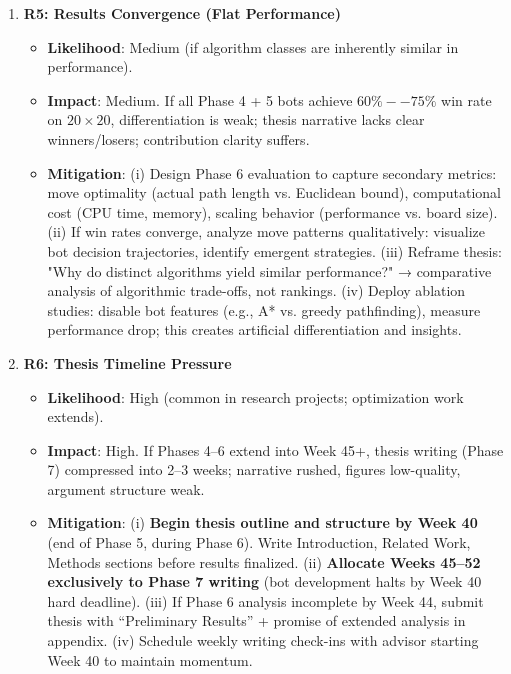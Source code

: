 \documentclass[11pt,a4paper]{article}
\begin{document}
\begin{enumerate}
    \item \textbf{R5: Results Convergence (Flat Performance)}
    \begin{itemize}
        \item \textbf{Likelihood}: Medium (if algorithm classes are inherently similar in performance).
        \item \textbf{Impact}: Medium. If all Phase 4 + 5 bots achieve $60\%--75\%$ win rate on $20 \times 20$, differentiation is weak; thesis narrative lacks clear winners/losers; contribution clarity suffers.
        \item \textbf{Mitigation}: (i) Design Phase 6 evaluation to capture secondary metrics: move optimality (actual path length vs. Euclidean bound), computational cost (CPU time, memory), scaling behavior (performance vs. board size). (ii) If win rates converge, analyze move patterns qualitatively: visualize bot decision trajectories, identify emergent strategies. (iii) Reframe thesis: "Why do distinct algorithms yield similar performance?" → comparative analysis of algorithmic trade-offs, not rankings. (iv) Deploy ablation studies: disable bot features (e.g., A* vs. greedy pathfinding), measure performance drop; this creates artificial differentiation and insights.
    \end{itemize}

    \item \textbf{R6: Thesis Timeline Pressure}
    \begin{itemize}
        \item \textbf{Likelihood}: High (common in research projects; optimization work extends).
        \item \textbf{Impact}: High. If Phases 4--6 extend into Week 45+, thesis writing (Phase 7) compressed into 2--3 weeks; narrative rushed, figures low-quality, argument structure weak.
        \item \textbf{Mitigation}: (i) \textbf{Begin thesis outline and structure by Week 40} (end of Phase 5, during Phase 6). Write Introduction, Related Work, Methods sections before results finalized. (ii) \textbf{Allocate Weeks 45--52 exclusively to Phase 7 writing} (bot development halts by Week 40 hard deadline). (iii) If Phase 6 analysis incomplete by Week 44, submit thesis with ``Preliminary Results'' + promise of extended analysis in appendix. (iv) Schedule weekly writing check-ins with advisor starting Week 40 to maintain momentum.
    \end{itemize}

\end{enumerate}
\end{document}
